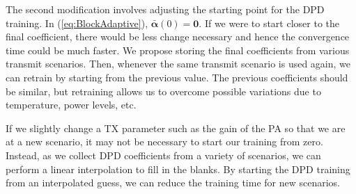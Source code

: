 The second modification involves adjusting the starting point for the DPD training. 
In (\ref{eq:BlockAdaptive}), $\bar{\boldsymbol{\alpha}}(0) = \mathbf{0}$. 
If we were to start closer to the final coefficient, there would be less change necessary and hence the convergence time could be much faster. 
We propose storing the final coefficients from various transmit scenarios. 
Then, whenever the same transmit scenario is used again, we can retrain by starting from the previous value. The previous coefficients should be similar, but retraining allows us to overcome possible variations due to temperature, power levels, etc. 

If we slightly change a TX parameter such as the gain of the PA so that we are at a new scenario, it may not be necessary to start our training from zero. Instead, as we collect DPD coefficients from a variety of scenarios, we can perform a linear interpolation to fill in the blanks. By starting the DPD training from an interpolated guess, we can reduce the training time for new scenarios.


